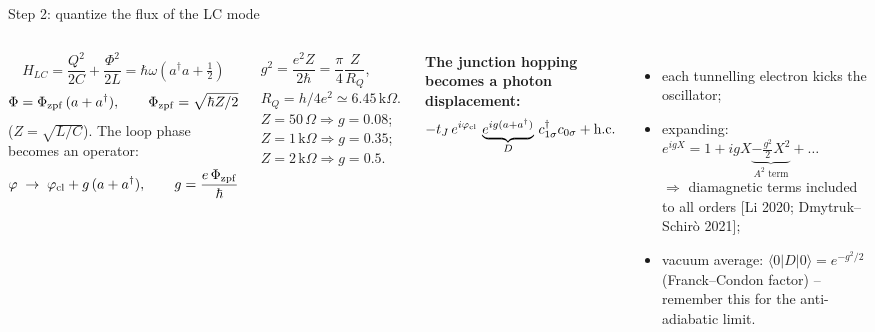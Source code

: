 \documentclass[aspectratio=169,9pt]{beamer}
\newcommand{\hw}{\hbar\omega}
\newcommand{\pcl}{\varphi_{\rm cl}}
\renewcommand{\cite}[1]{{\scriptsize\textcolor{ink!60}{[#1]}}}
\begin{document}
\begin{frame}{Step 2: quantize the flux of the LC mode}
  \begin{columns}[T]
    \[
      H_{LC}=\frac{Q^2}{2C}+\frac{\Phi^2}{2L}=\hw\left(a^\dagger a+\tfrac12\right)
    \]
    \[
      \Phi=\Phi_{\rm zpf}\,(a+a^\dagger),\qquad \Phi_{\rm zpf}=\sqrt{\hbar Z/2}
    \]
    ($Z=\sqrt{L/C}$). The loop phase becomes an operator:
    \[
      \varphi\;\to\;\pcl+g\,(a+a^\dagger),\qquad g=\frac{e\,\Phi_{\rm zpf}}{\hbar}
    \]
    \begin{calcbox}[title={$g$ in circuit language}]
      \small $g^2=\dfrac{e^2Z}{2\hbar}=\dfrac{\pi}{4}\dfrac{Z}{R_Q}$, \ $R_Q=h/4e^2\simeq6.45\,\mathrm{k}\Omega$.\\[0.5mm]
      $Z=50\,\Omega\Rightarrow g=0.08$;\ $Z=1\,\mathrm{k}\Omega\Rightarrow g=0.35$;\ $Z=2\,\mathrm{k}\Omega\Rightarrow g=0.5$.
    \end{calcbox}
    \textbf{The junction hopping becomes a photon displacement:}
    \[
      -t_J\,e^{i\pcl}\,\underbrace{e^{ig(a+a^\dagger)}}_{D}\,c^\dagger_{1\sigma}c_{0\sigma}+\text{h.c.}
    \]
    \begin{itemize}\small
      \item each tunnelling electron kicks the oscillator;
      \item expanding: $e^{igX}=1+igX\underbrace{-\tfrac{g^2}{2}X^2}_{A^2\text{ term}}+\dots$\\
            $\Rightarrow$ diamagnetic terms included \alert{to all orders} \cite{Li 2020; Dmytruk--Schir\`o 2021};
      \item vacuum average: $\langle0|D|0\rangle=e^{-g^2/2}$ (Franck--Condon factor) -- remember this for the
            anti-adiabatic limit.
    \end{itemize}
  \end{columns}
\end{frame}
\end{document}
